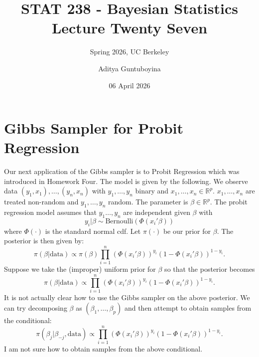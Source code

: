 \documentclass{scrartcl}
\newcommand{\R}{{\mathbb R}}
\begin{document}
\title{STAT 238 - Bayesian Statistics  \\
  Lecture Twenty Seven} 
\subtitle{Spring 2026, UC Berkeley}

\author{Aditya Guntuboyina}


\date{06 April 2026}

\maketitle

\section{Gibbs Sampler for Probit Regression}

Our next application of the Gibbs sampler is to Probit
Regression which was introduced in Homework Four. The model is given by
the following. We observe data $(y_1, x_1), \dots, (y_n, x_n)$ with 
  $y_1, \dots, y_n$ binary and $x_1, \dots, x_n \in \R^p$. $x_1,
  \dots, x_n$ are treated non-random and $y_1, \dots, y_n$ random. The 
  parameter is $\beta \in \R^p$. The probit regression model assumes
  that $y_1 \dots, y_n$ are independent given $\beta$ with
  \begin{equation*}
    y_i | \beta \sim \text{Bernoulli} \left(\Phi(x_i' \beta) \right)
  \end{equation*}
  where $\Phi(\cdot)$ is the standard normal cdf. Let $\pi(\cdot)$ be
  our prior for $\beta$. The posterior is then given by:
  \begin{equation*}
    \pi(\beta | \text{data}) \propto \pi(\beta) \prod_{i=1}^n
    \left(\Phi(x_i' \beta) \right)^{y_i} \left(1 - \Phi(x_i' \beta)
    \right)^{1-y_i}. 
  \end{equation*}
  Suppose we take the (improper) uniform prior for $\beta$ so that
  the posterior becomes
  \begin{equation*}
    \pi(\beta | \text{data}) \propto \prod_{i=1}^n
    \left(\Phi(x_i' \beta) \right)^{y_i} \left(1 - \Phi(x_i' \beta)
    \right)^{1-y_i}. 
  \end{equation*}
  It is not actually clear how to use the Gibbs sampler on the above
  posterior. We can try decomposing $\beta$ as $(\beta_1, \dots,
  \beta_p)$ and then attempt to obtain samples from the conditional:
  \begin{equation*}
    \pi(\beta_j | \beta_{-j}, \text{data}) \propto \prod_{i=1}^n
    \left(\Phi(x_i' \beta) \right)^{y_i} \left(1 - \Phi(x_i' \beta)
    \right)^{1-y_i}. 
  \end{equation*}
  I am not sure how to obtain samples from the above conditional.
\end{document}
